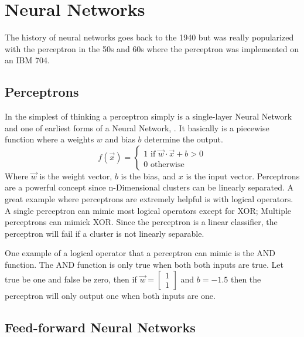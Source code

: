 \section{Neural Networks}

The history of neural networks goes back to the 1940 but was really popularized with the perceptron in the 50s and 60s where the perceptron was implemented on an IBM 704.

\subsection{Perceptrons}

In the simplest of thinking a perceptron simply is a single-layer Neural Network and one of earliest forms of a Neural Network, \cite{rosenblatt_1958}. It basically is a piecewise function where a weights $w$ and bias $b$ determine the output. $$f(\vec{x})=\begin{cases}
1 \mbox{ if } \vec{w}\cdot \vec{x}+b>0 \\
0 \mbox{ otherwise }
\end{cases}$$ Where $\vec{w}$  is the weight vector, $b$ is the bias, and $x$ is the input vector.  Perceptrons are a powerful concept since n-Dimensional clusters can be linearly separated. A great example where perceptrons are extremely helpful is with logical operators. A single perceptron can mimic most logical operators except for XOR; Multiple perceptrons can mimick XOR. Since the perceptron is a linear classifier, the perceptron will fail if a cluster is not linearly separable. 

One example of a logical operator that a perceptron can mimic is the AND function. The AND function is only true when both both inputs are true. Let true be one and false be zero, then if $\vec{w}=\begin{bmatrix}1 \\ 1\end{bmatrix}$ and $b=-1.5$ then the perceptron will only output one when both inputs are one.

\subsection{Feed-forward Neural Networks}

